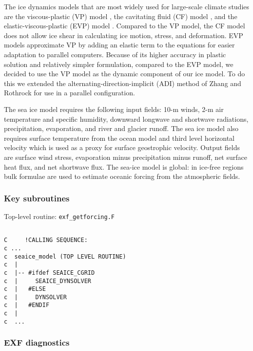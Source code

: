 The ice dynamics models that are most widely used for large-scale
climate studies are the viscous-plastic (VP) model \cite{hib79}, the
cavitating fluid (CF) model \cite{fla92}, and the
elastic-viscous-plastic (EVP) model \cite{hun97}.  Compared to the VP
model, the CF model does not allow ice shear in calculating ice
motion, stress, and deformation.  EVP models approximate VP by adding
an elastic term to the equations for easier adaptation to parallel
computers.  Because of its higher accuracy in plastic solution and
relatively simpler formulation, compared to the EVP model, we decided
to use the VP model as the dynamic component of our ice model.  To do
this we extended the alternating-direction-implicit (ADI) method of
Zhang and Rothrock \cite{zha00} for use in a parallel configuration.

The sea ice model requires the following input fields: 10-m winds, 2-m
air temperature and specific humidity, downward longwave and shortwave
radiations, precipitation, evaporation, and river and glacier runoff.
The sea ice model also requires surface temperature from the ocean
model and third level horizontal velocity which is used as a proxy for
surface geostrophic velocity.  Output fields are surface wind stress,
evaporation minus precipitation minus runoff, net surface heat flux,
and net shortwave flux.  The sea-ice model is global: in ice-free
regions bulk formulae are used to estimate oceanic forcing from the
atmospheric fields.



\subsubsection{Key subroutines
\label{sec:pkg:seaice:subroutines}}

Top-level routine: \texttt{exf\_getforcing.F}

{\footnotesize
\begin{verbatim}

C     !CALLING SEQUENCE:
c ...
c  seaice_model (TOP LEVEL ROUTINE)
c  |
c  |-- #ifdef SEAICE_CGRID
c  |     SEAICE_DYNSOLVER
c  |   #ELSE
c  |     DYNSOLVER
c  |   #ENDIF
c  |
c  ...

\end{verbatim}
}



\subsubsection{EXF diagnostics
\label{sec:pkg:seaice:diagnostics}}

